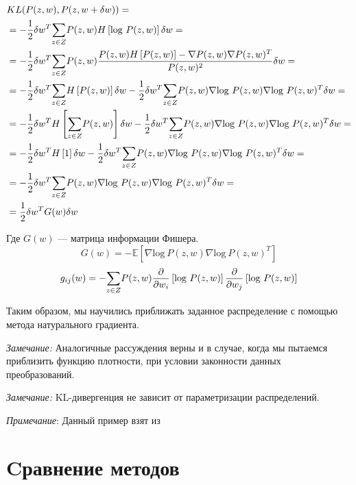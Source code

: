 \documentclass[a4paper,12pt]{article}
\begin{document}
$$
\begin{aligned}
    & KL(P(z, w), P(z, w + \delta w)) = \\
    & = -\frac{1}{2} \delta w^T\overset{}{\underset{z \in Z}{\sum}}{P}(z, w) H\left[\mbox{log} ~ P(z, w)\right] \delta w = \\
    & = -\frac{1}{2} \delta w^T\overset{}{\underset{z \in Z}{\sum}}{P}(z, w) \frac{P(z, w) H\left[P(z, w)\right] - \nabla P(z, w)\nabla P(z, w)^T}{P(z, w)^2} \delta w = \\
    & = -\frac{1}{2} \delta w^T\overset{}{\underset{z \in Z}{\sum}}{H}\left[P(z, w)\right] \delta w - \frac{1}{2} \delta w^T\overset{}{\underset{z \in Z}{\sum}}{P}(z, w) \nabla \mbox{log} ~ P(z, w)\nabla \mbox{log} ~ P(z, w)^T \delta w = \\
    & = -\frac{1}{2} \delta w^TH\left[\overset{}{\underset{z \in Z}{\sum}}{P}(z, w)\right] \delta w - \frac{1}{2} \delta w^T\overset{}{\underset{z \in Z}{\sum}}{P}(z, w) \nabla \mbox{log} ~ P(z, w)\nabla \mbox{log} ~ P(z, w)^T \delta w = \\
    & = -\frac{1}{2} \delta w^TH\left[1\right] \delta w - \frac{1}{2} \delta w^T\overset{}{\underset{z \in Z}{\sum}}{P}(z, w) \nabla \mbox{log} ~ P(z, w)\nabla \mbox{log} ~ P(z, w)^T \delta w = \\
    & = -\frac{1}{2} \delta w^T\overset{}{\underset{z \in Z}{\sum}}{P}(z, w) \nabla \mbox{log} ~ P(z, w)\nabla \mbox{log} ~ P(z, w)^T \delta w = \\
    & = \frac{1}{2} \delta w^T G(w) \delta w \\
\end{aligned}
$$

Где $G(w)$ --- матрица информации Фишера. \label{FisherMatrix}
$$G(w) = \mathbb{-E} \left[ \nabla \mbox{log} ~ P(z, w) \nabla \mbox{log} ~ P(z, w)^T \right] $$
$$g_{ij}(w) = -\overset{}{\underset{z \in Z}{\sum}}{P(z, w)\frac{\partial}{\partial w_i}\left[ \mbox{log} ~ P(z, w)\right] \frac{\partial}{\partial w_j}\left[ \mbox{log} ~ P(z, w)\right]}$$

Таким образом, мы научились приближать заданное распределение с помощью метода натурального градиента.

\emph{Замечание:}
Аналогичные рассуждения верны и в случае, когда мы пытаемся приблизить функцию плотности, при условии законности данных преобразований.

\emph{Замечание:}
KL-дивергенция не зависит от параметризации распределений.

\emph{Примечание}:
Данный пример взят из \cite{AmariWorks}

\newpage

\section{Cравнение методов}
\end{document}
